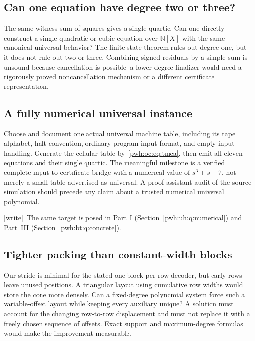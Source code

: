 \documentclass[11pt,letterpaper]{article}
\numberwithin{equation}{section}
\theoremstyle{definition}
\newcommand{\N}{\mathbb N}
\newcommand{\wtag}{\textup{[write]}}
\begin{document}
\subsection{Can one equation have degree two or three?}

The same-witness sum of squares gives a single quartic. Can one directly
construct a single quadratic or cubic equation over $\N[X]$ with the
same canonical universal behavior? The finite-state theorem rules out
degree one, but it does not rule out two or three. Combining signed
residuals by a simple sum is unsound because cancellation is possible;
a lower-degree finalizer would need a rigorously proved noncancellation
mechanism or a different certificate representation.

\subsection{A fully numerical universal instance}\label{pwh:oc:q:numerical}

Choose and document one actual universal machine table, including its
tape alphabet, halt convention, ordinary program-input format, and empty
input handling. Generate the cellular table by~\eqref{pwh:oc:eq:tmca}, then
emit all eleven equations and their single quartic. The meaningful
milestone is a verified complete input-to-certificate bridge with a
numerical value of $s^3+s+7$, not merely a small table advertised as
universal. A proof-assistant audit of the source simulation should
precede any claim about a trusted numerical universal polynomial.

\wtag\ The same target is posed in Part~I (Section~\ref{pwh:uh:q:numerical})
and Part~III (Section~\ref{pwh:bt:q:concrete}).

\subsection{Tighter packing than constant-width blocks}

Our stride is minimal for the stated one-block-per-row decoder, but early
rows leave unused positions. A triangular layout using cumulative row
widths would store the cone more densely. Can a fixed-degree polynomial
system force such a variable-offset layout while keeping every auxiliary
unique? A solution must account for the changing row-to-row displacement
and must not replace it with a freely chosen sequence of offsets. Exact
support and maximum-degree formulas would make the improvement measurable.
\end{document}
